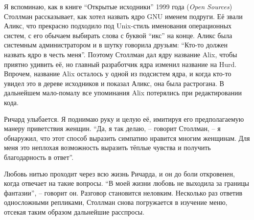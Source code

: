 Я вспоминаю, как в книге \enquote{Открытые исходники} 1999 года (\textit{Open Sources}) Столлман рассказывает, как хотел назвать ядро GNU именем подруги. Её звали Аликс, что прекрасно подходило под Unix-стиль именования операционных систем, с его обычаем выбирать слова с буквой \enquote{икс} на конце. Аликс была системным администратором и в шутку говорила друзьям: \enquote{Кто-то должен назвать ядро в честь меня}. Поэтому Столлман дал ядру название Alix, чтобы приятно удивить её, но главный разработчик ядра изменил название на Hurd. Впрочем, название Alix осталось у одной из подсистем ядра, и когда кто-то увидел это в дереве исходников и показал Аликс, она была растрогана. В дальнейшем мало-помалу все упоминания Alix потерялись при редактировании кода.

Ричард улыбается. Я поднимаю руку и целую её, имитируя его предполагаемую манеру приветствия женщин. \enquote{Да, я так делаю, -- говорит Столлман, -- я обнаружил, что этот способ выразить симпатию нравится многим женщинам. Для меня это неплохая возможность выразить тёплые чувства и получить благодарность в ответ}.

Любовь нитью проходит через всю жизнь Ричарда, и он до боли откровенен, когда отвечает на такие вопросы. \enquote{В моей жизни любовь не выходила за границы фантазии}, -- говорит он. Разговор становится неловким. Несколько раз ответив односложными репликами, Столлман снова погружается в изучение меню, отсекая таким образом дальнейшие расспросы.

